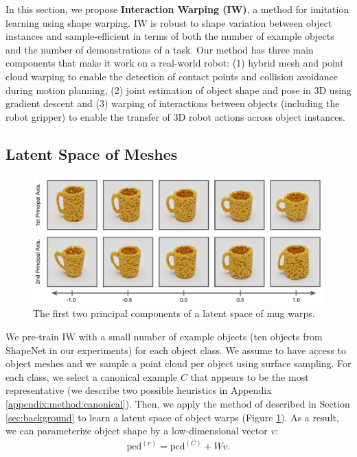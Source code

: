 \documentclass{article}
\newcommand{\rob}[1]{\textcolor{green}{[\textbf{rob:} #1]}}
\newcommand{\pcx}[1]{\mathrm{pcd}^{(#1)}}
\newcommand{\pcc}{\pcx{C}}
\begin{document}

In this section, we propose \textbf{Interaction Warping (IW)}, a method for imitation learning using shape warping. IW is robust to shape variation between object instances and sample-efficient in terms of both the number of example objects and the number of demonstrations of  a task. Our method has three main components that make it work on a real-world robot: (1) hybrid mesh and point cloud warping to enable the detection of contact points and collision avoidance during motion planning, (2) joint estimation of object shape and pose in 3D using gradient descent and (3) warping of interactions between objects (including the robot gripper) to enable the transfer of 3D robot actions across object instances.

\subsection{Latent Space of Meshes}
\label{sec:methods:mesh}

\begin{figure}
    \centering
    \includegraphics[width=\textwidth]{figures/latent_mugs2.pdf}
    \caption{The first two principal components of a latent space of mug warps.}
    \label{fig:latent}
\end{figure}

We pre-train IW with a small number of example objects (ten objects from ShapeNet \cite{chang15shapenet} in our experiments) for each object class. We assume to have access to object meshes and we sample a point cloud per object using surface sampling. For each class, we select a canonical example $C$ that appears to be the most representative (we describe two possible heuristics in Appendix \ref{appendix:method:canonical}). Then, we apply the method of \cite{rodriguez18transferring} described in Section \ref{sec:background} to learn a latent space of object warps (Figure \ref{fig:latent}). As a result, we can parameterize object shape by a low-dimensional vector $v$:
\begin{align}
    \pcx{v} = \pcc + W v. \tag{3}
\end{align}
\end{document}
